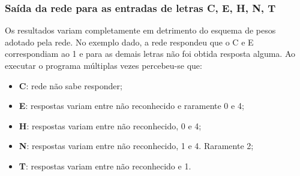 \documentclass[hidelinks,12pt]{article}
\begin{document}
		\subsubsection{Saída da rede para as entradas de letras C, E, H, N, T}
		
			Os resultados variam completamente em detrimento do esquema de pesos adotado pela rede. No exemplo dado, a rede respondeu que o C e E correspondiam ao 1 e para as demais letras não foi obtida resposta alguma. Ao executar o programa múltiplas vezes percebeu-se que:
			
			\begin{itemize}
				\item \textbf{C}: rede não sabe responder;
				\item \textbf{E}: respostas variam entre não reconhecido e raramente 0 e 4;
				\item \textbf{H}: respostas variam entre não reconhecido, 0 e 4;
				\item \textbf{N}: respostas variam entre não reconhecido, 1 e 4. Raramente 2;
				\item \textbf{T}: respostas variam entre não reconhecido e 1.
			\end{itemize} 
	
\end{document}
